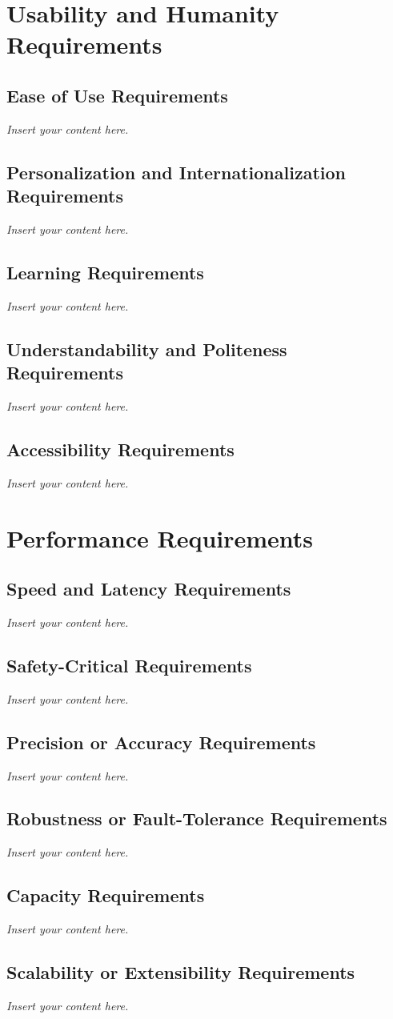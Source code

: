 \documentclass[12pt]{article}
\newcommand{\lips}{\textit{Insert your content here.}}
\begin{document}
\section{Usability and Humanity Requirements}
\subsection{Ease of Use Requirements}
\lips
\subsection{Personalization and Internationalization Requirements}
\lips
\subsection{Learning Requirements}
\lips
\subsection{Understandability and Politeness Requirements}
\lips
\subsection{Accessibility Requirements}
\lips

\section{Performance Requirements}
\subsection{Speed and Latency Requirements}
\lips
\subsection{Safety-Critical Requirements}
\lips
\subsection{Precision or Accuracy Requirements}
\lips
\subsection{Robustness or Fault-Tolerance Requirements}
\lips
\subsection{Capacity Requirements}
\lips
\subsection{Scalability or Extensibility Requirements}
\lips
\end{document}
